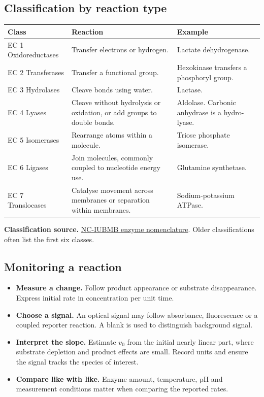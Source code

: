 \documentclass[12pt,a4paper]{article}
\begin{document}
\subsection{Classification by reaction type}
\par\vspace{5pt}
\begingroup
\setlength{\extrarowheight}{1pt}
\noindent\begin{tabularx}{\linewidth}{|B{3.5cm}|Y|Y|}
\hline
\textbf{Class} & \textbf{Reaction} & \textbf{Example} \\ \hline
EC 1 Oxidoreductases & Transfer electrons or hydrogen. & Lactate dehydrogenase. \\ \hline
EC 2 Transferases & Transfer a functional group. & Hexokinase transfers a phosphoryl group. \\ \hline
EC 3 Hydrolases & Cleave bonds using water. & Lactase. \\ \hline
EC 4 Lyases & Cleave without hydrolysis or oxidation, or add groups to double bonds. & Aldolase. Carbonic anhydrase is a hydro-lyase. \\ \hline
EC 5 Isomerases & Rearrange atoms within a molecule. & Triose phosphate isomerase. \\ \hline
EC 6 Ligases & Join molecules, commonly coupled to nucleotide energy use. & Glutamine synthetase. \\ \hline
EC 7 Translocases & Catalyse movement across membranes or separation within membranes. & Sodium-potassium ATPase. \\ \hline
\end{tabularx}\par
\endgroup
\textbf{Classification source.} \href{https://iubmb.qmul.ac.uk/}{NC-IUBMB enzyme nomenclature}. Older classifications often list the first six classes.
\subsection{Monitoring a reaction}
\begin{itemize}[leftmargin=*, itemsep=3pt, topsep=4pt]
  \item \textbf{Measure a change.} Follow product appearance or substrate disappearance. Express initial rate in concentration per unit time.
  \item \textbf{Choose a signal.} An optical signal may follow absorbance, fluorescence or a coupled reporter reaction. A blank is used to distinguish background signal.
  \item \textbf{Interpret the slope.} Estimate $v_0$ from the initial nearly linear part, where substrate depletion and product effects are small. Record units and ensure the signal tracks the species of interest.
  \item \textbf{Compare like with like.} Enzyme amount, temperature, pH and measurement conditions matter when comparing the reported rates.
\end{itemize}
\end{document}
